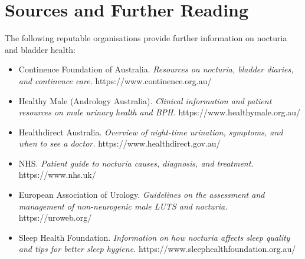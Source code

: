 \section*{Sources and Further Reading}
The following reputable organisations provide further information on nocturia and bladder health:
\begin{itemize}
    \item Continence Foundation of Australia. \textit{Resources on nocturia, bladder diaries, and continence care.} https://www.continence.org.au/
    \item Healthy Male (Andrology Australia). \textit{Clinical information and patient resources on male urinary health and BPH.} https://www.healthymale.org.au/
    \item Healthdirect Australia. \textit{Overview of night-time urination, symptoms, and when to see a doctor.} https://www.healthdirect.gov.au/
    \item NHS. \textit{Patient guide to nocturia causes, diagnosis, and treatment.} https://www.nhs.uk/
    \item European Association of Urology. \textit{Guidelines on the assessment and management of non-neurogenic male LUTS and nocturia.} https://uroweb.org/
    \item Sleep Health Foundation. \textit{Information on how nocturia affects sleep quality and tips for better sleep hygiene.} https://www.sleephealthfoundation.org.au/
\end{itemize}
